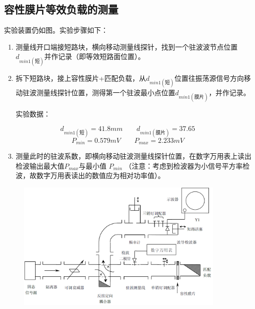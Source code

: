 \documentclass{../source/Experiment}
\begin{document}
        \subsection{容性膜片等效负载的测量}
        实验装置仍如图。实验步骤如下：
            \begin{enumerate}
                \item 测量线开口端接短路块，横向移动测量线探针，找到一个驻波波节点位置$d_{min1(\mbox{短})}$并作记录（即等效短路面位置）。
                \item 拆下短路块，接上容性膜片+匹配负载，从$d_{min1(\mbox{短})}$位置往振荡源信号方向移动驻波测量线探针位置，测得第一个驻波最小点位置$d_{min1(\mbox{膜片})}$，并作记录。
                
                实验数据：

                $$d_{min1(\mbox{短})} = 41.8mm \qquad d_{min1(\mbox{膜片})} = 37.65\qquad$$
                $$P_{min} = 0.579mV\qquad P_{max} = 2.233mV\qquad$$

                \item 测量此时的驻波系数，即横向移动驻波测量线探针位置，在数字万用表上读出检波输出最大值$P_{max}$与最小值 $P_{min}$ （注意：考虑到检波器为小信号平方率检波，故数字万用表读出的数值应为相对功率值）。
            \end{enumerate}

            \begin{figure}[H]
                \centering
                \includegraphics[width = 0.9\textwidth]{pic/1-4.png}
                \caption{}
            \end{figure}
\end{document}
